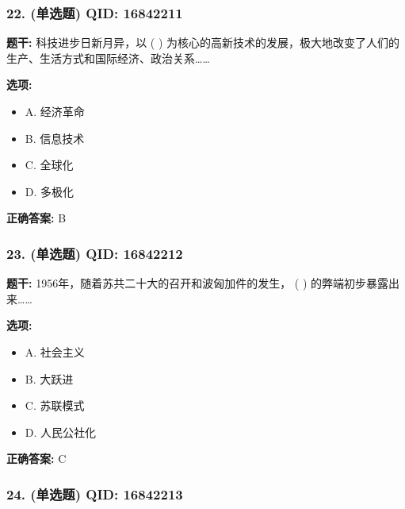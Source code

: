 \documentclass[12pt,UTF8]{ctexart}
\begin{document}
\subsubsection*{22. (单选题) \small QID: 16842211}

\textbf{题干:}
科技进步日新月异，以 ( ) 为核心的高新技术的发展，极大地改变了人们的生产、生活方式和国际经济、政治关系……

\textbf{选项:}
\begin{itemize}[leftmargin=*]

  \item A. 经济革命

  \item B. 信息技术

  \item C. 全球化

  \item D. 多极化

\end{itemize}

\textbf{正确答案:}
B

\vspace{0.3em}\hrulefill\vspace{0.7em}

\subsubsection*{23. (单选题) \small QID: 16842212}

\textbf{题干:}
1956年，随着苏共二十大的召开和波匈加件的发生， ( ) 的弊端初步暴露出来……

\textbf{选项:}
\begin{itemize}[leftmargin=*]

  \item A. 社会主义

  \item B. 大跃进

  \item C. 苏联模式

  \item D. 人民公社化

\end{itemize}

\textbf{正确答案:}
C

\vspace{0.3em}\hrulefill\vspace{0.7em}

\subsubsection*{24. (单选题) \small QID: 16842213}
\end{document}
